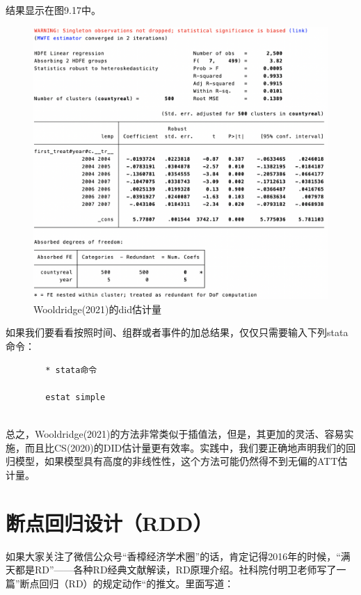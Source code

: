 \documentclass[cn,12pt,math=newtx,citestyle=gb7714-2015,bibstyle=gb7714-2015]{elegantbook}
\begin{document}
    结果显示在图9.17中。
	
	\begin{figure}[tbph]
		\centering
		\includegraphics[width=1\linewidth]{jwdid}
		\caption{Wooldridge(2021)的did估计量}
		\label{fig:jwdid}
	\end{figure}

    如果我们要看看按照时间、组群或者事件的加总结果，仅仅只需要输入下列stata命令：
    
    \begin{lstlisting}
    	* stata命令
    
    	estat simple
    	
    \end{lstlisting}

    总之，Wooldridge(2021)的方法非常类似于插值法，但是，其更加的灵活、容易实施，而且比CS(2020)的DID估计量更有效率。实践中，我们要正确地声明我们的回归模型，如果模型具有高度的非线性性，这个方法可能仍然得不到无偏的ATT估计量。




	\chapter{断点回归设计（RDD）}
	
	如果大家关注了微信公众号“香樟经济学术圈”的话，肯定记得2016年的时候，“满天都是RD”——各种RD经典文献解读，RD原理介绍。社科院付明卫老师写了一篇”断点回归（RD）的规定动作“的推文。里面写道：
	
\end{document}
